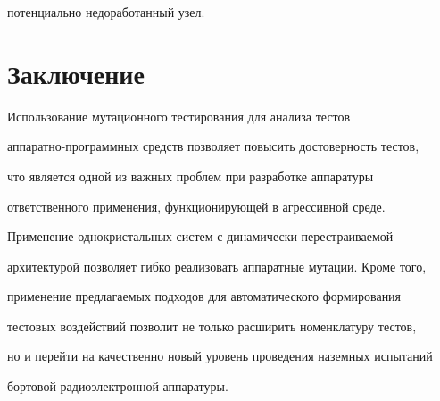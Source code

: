 потенциально недоработанный узел.





\vspace*{-4pt}





    \section{Заключение}





    \vspace*{-2pt}





    Использование мутационного тестирования для анализа тестов


аппаратно-про\-грам\-мных средств позволяет повысить достоверность тестов,


что является одной из важных проблем при разработке аппаратуры


ответственного применения, функционирующей в агрессивной среде.


Применение однокристальных систем с динамически перестраиваемой


архитектурой позволяет гибко реализовать аппаратные мутации. Кроме того,


применение предлагаемых подходов для автоматического формирования


тестовых воздействий позволит не только расширить номенклатуру тестов,


но и перейти на качественно новый уровень проведения наземных испытаний


бортовой радиоэлектронной аппаратуры.





\vspace*{-4pt}





